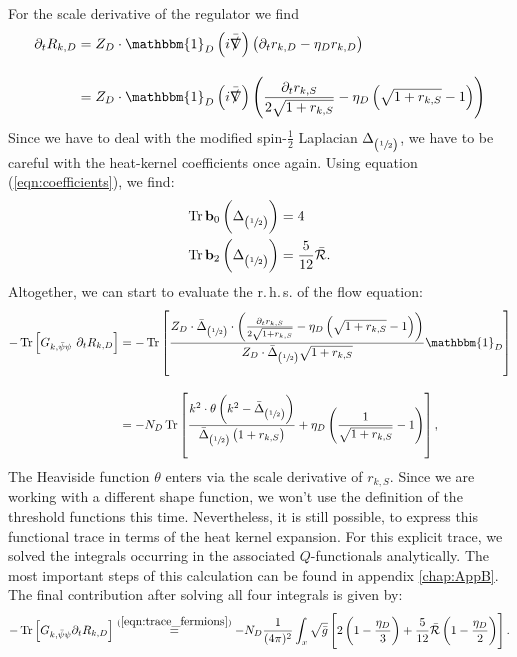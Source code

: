 For the scale derivative of the regulator we find
\begin{equation}
\begin{aligned}
	\partial_tR_{k,D} &=  
	Z_D\cdot\mathbbm{1}_D\left(i\bar{\slashed{\nabla}}\right)\left(\partial_t r_{k,D} - \eta_D r_{k,D}\right) \\[10pt]
	&=Z_D\cdot\mathbbm{1}_D\left(i\bar{\slashed{\nabla}}\right)\left(\frac{\partial_t r_{k,S}}{2\sqrt{1+r_{k, S}}} - \eta_D\left(\sqrt{1+r_{k,S}} -1\right)\right)
\end{aligned} 
\end{equation}
Since we have to deal with the modified spin-$\frac{1}{2}$ Laplacian $\Delta_{\left(\sfrac{1}{2}\right)}$, we have to be careful with the heat-kernel coefficients once again. Using equation (\ref{eqn:coefficients}), we find:
\begin{equation}
\begin{aligned}
	\operatorname{Tr}\mathbf{b}_0\left(\Delta_{\left(\sfrac{1}{2}\right)}\right) &= 4\\
	\operatorname{Tr}\mathbf{b}_2\left(\Delta_{\left(\sfrac{1}{2}\right)}\right) &= \frac{5}{12}\bar{\mathcal{R}}. \\
	\label{eqn:fermion_coefficients}
\end{aligned} 
\end{equation}
Altogether, we can start to evaluate the r.\,h.\,s. of the flow equation:
\begin{equation}
\begin{aligned}
	-\tr{G_{k, \bar{\psi}\psi}\ \partial_t R_{k,D}} &=-\tr{\frac{Z_D\cdot\bar{\Delta}_{\left(\sfrac{1}{2}\right)}\cdot\left(\frac{\partial_t r_{k,S}}{2\sqrt{1+r_{k, S}}} - \eta_D\left(\sqrt{1+r_{k,S}} -1\right)\right)}{Z_D\cdot\bar{\Delta}_{\left(\sfrac{1}{2}\right)}\sqrt{1 + r_{k,S}}}\mathbbm{1}_D} \\[10pt]
	&= -N_D\tr{\frac{k^2\cdot\theta\left(k^2-\bar{\Delta}_{\left(\sfrac{1}{2}\right)}\right)}{\bar{\Delta}_{\left(\sfrac{1}{2}\right)}\left(1+r_{k,S}\right)} + \eta_D\left(\frac{1}{\sqrt{1+r_{k,S}}}-1\right)},
	\end{aligned}
\end{equation}
The Heaviside function $\theta$ enters via the scale derivative of $r_{k,S}$. Since we are working with a different shape function, we won't use the definition of the threshold functions this time. Nevertheless, it is still possible, to express this functional trace in terms of the heat kernel expansion. For this explicit trace, we solved the integrals occurring in the associated $Q$-functionals analytically. The most important steps of this calculation can be found in appendix \ref{chap:AppB}. The final contribution after solving all four integrals is given by:
\begin{equation}
	-\operatorname{Tr}\left[G_{k, \bar{\psi} \psi} \partial_{t} R_{k, D}\right]\overset{(\mathrm{\ref{eqn:trace_fermions}})}{=} -N_D\frac{1}{(4\pi)^2}\int_x\sqrt{\bar{g}}\left[2\left(1-\frac{\eta_D}{3}\right) + \frac{5}{12}\bar{\mathcal{R}}\left(1-\frac{\eta_D}{2}\right)\right].
\end{equation}
